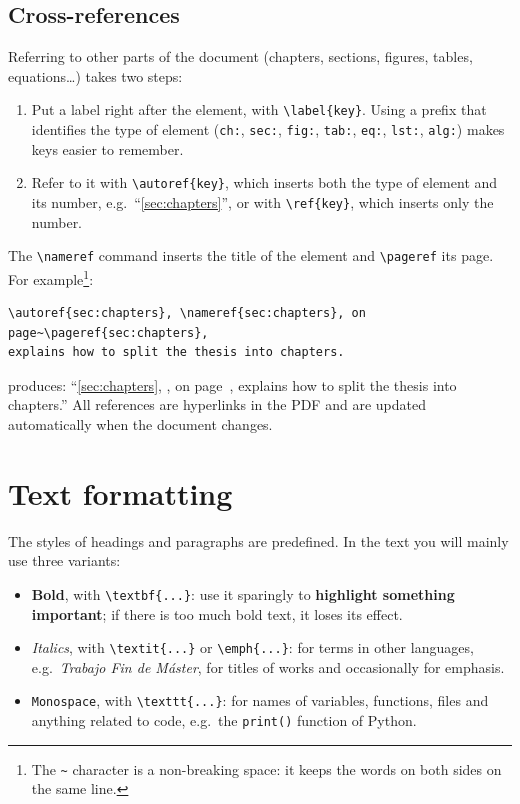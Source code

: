 \subsection{Cross-references}\label{sec:cross-references}

Referring to other parts of the document (chapters, sections, figures, tables,
equations\dots) takes two steps:

\begin{enumerate}
  \item Put a label right after the element, with \verb|\label{key}|. Using a prefix that
        identifies the type of element (\texttt{ch:}, \texttt{sec:}, \texttt{fig:},
        \texttt{tab:}, \texttt{eq:}, \texttt{lst:}, \texttt{alg:}) makes keys easier to
        remember.
  \item Refer to it with \verb|\autoref{key}|, which inserts both the type of element and its
        number, e.g.\ \enquote{\autoref{sec:chapters}}, or with \verb|\ref{key}|, which
        inserts only the number.
\end{enumerate}

The \verb|\nameref| command inserts the title of the element and \verb|\pageref| its page.
For example\footnote{The \texttt{\textasciitilde} character is a non-breaking space: it
keeps the words on both sides on the same line.}:

\begin{lstlisting}[language={[LaTeX]TeX}, caption={Cross-references.}, label=lst:refs]
\autoref{sec:chapters}, \nameref{sec:chapters}, on page~\pageref{sec:chapters},
explains how to split the thesis into chapters.
\end{lstlisting}

produces: \enquote{\autoref{sec:chapters}, , on
page~\pageref{sec:chapters}, explains how to split the thesis into chapters.} All
references are hyperlinks in the PDF and are updated automatically when the document
changes.

\section{Text formatting}\label{sec:formatting}

The styles of headings and paragraphs are predefined. In the text you will mainly use three
variants:

\begin{itemize}
  \item \textbf{Bold}, with \verb|\textbf{...}|: use it sparingly to \textbf{highlight
        something important}; if there is too much bold text, it loses its effect.
  \item \textit{Italics}, with \verb|\textit{...}| or \verb|\emph{...}|: for terms in other
        languages, e.g.\ \textit{Trabajo Fin de Máster}, for titles of works and
        occasionally for emphasis.
  \item \texttt{Monospace}, with \verb|\texttt{...}|: for names of variables, functions,
        files and anything related to code, e.g.\ the \texttt{print()} function of Python.
\end{itemize}

